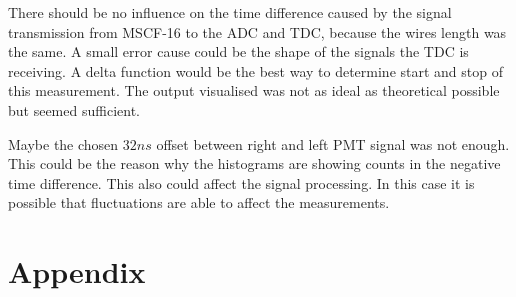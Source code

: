 \documentclass[]{article}
\begin{document}
There should be no influence on the time difference caused by the signal transmission from MSCF-16 to the ADC and TDC, because the wires length was the same. A small error cause could be the shape of the signals the TDC is receiving. A delta function would be the best way to determine start and stop of this measurement. The output visualised was not as ideal as theoretical possible but seemed sufficient.

Maybe the chosen $32ns$ offset between right and left PMT signal was not enough. This could be the reason why the histograms are showing counts in the negative time difference. This also could affect the signal processing. In this case it is possible that fluctuations are able to affect the measurements.



\section{Appendix}\label{appendix}
\end{document}
